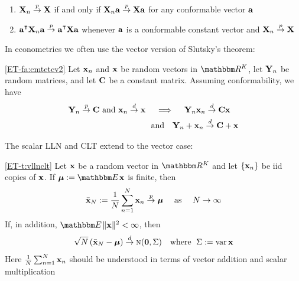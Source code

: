 \begin{frame}

    \vspace{2em}
    \begin{enumerate}
        \conti
        \item $\mathbf X_n \stackrel { p } {\to} \mathbf X$ if and only if $\mathbf X_n {\mathbf a} \stackrel { p } {\to}
        \mathbf X {\mathbf a}$ for any conformable vector ${\mathbf a}$
        \item $\bolda^\T \boldX_n \bolda \toprob \bolda^\T \boldX \bolda$
             whenever ${\mathbf a}$ is a conformable constant vector and 
             $\mathbf X_n \stackrel { p } {\to} \mathbf X$
    \end{enumerate}
    
\end{frame}

\begin{frame}

    \vspace{2em}
    In econometrics we often use the vector version of Slutsky's theorem:

    \vspace{1em}
    \Fact\eqref{ET-fa:cmtetcv2}
        Let ${\mathbf x}_n$ and ${\mathbf x}$ be random vectors in $\RR^K$, let 
        $\mathbf Y_n$ be random matrices, and let $\mathbf C$ be a constant matrix.
        Assuming conformability, we have
        \begin{align*}
            \mathbf Y_n \stackrel { p } {\to} \mathbf C \text{ and } {\mathbf x}_n \stackrel { d } {\to} {\mathbf x}
            \quad \implies \quad
                \mathbf Y_n {\mathbf x}_n \stackrel { d } {\to} \mathbf C {\mathbf x}
                \quad \\ \text{and} \quad
                \mathbf Y_n + {\mathbf x}_n \stackrel { d } {\to} \mathbf C + {\mathbf x}
        \end{align*}

\end{frame}

\begin{frame}

    \vspace{2em}
    The scalar LLN and CLT extend to the vector case:
    
    \Thm\eqref{ET-t:vllnclt}
        Let ${\mathbf x}$ be a random vector in $\RR^K$ and let $\{{\mathbf x}_n\}$ be {\sc
        iid} copies of ${\mathbf x}$.  If $\boldmu := \EE \boldx$ is finite, then
        \begin{equation}
            \label{eq:vlln}
            \bar {{\mathbf x}}_N :=
            \frac{1}{N} \sum_{n=1}^N {\mathbf x}_n \stackrel { p } {\to} {\boldsymbol \mu}
             \quad \text{ as } \quad N \to \infty
        \end{equation}
        If, in addition, $\EE \|\boldx\|^2 < \infty$, then
        \begin{equation}
            \label{eq:vclt}
            \sqrt{N} \left( \bar {{\mathbf x}}_N - {\boldsymbol \mu} \right)
            \stackrel { d } {\to} \textrm{\sc n}({\mathbf 0}, \Sigma)
            \quad \text{where } \;
            \Sigma := \operatorname{var} {\mathbf x}
        \end{equation}
    Here $\frac{1}{N} \sum_{n=1}^N {\mathbf x}_n$ should
    be understood in terms of vector addition and scalar multiplication

\end{frame}

